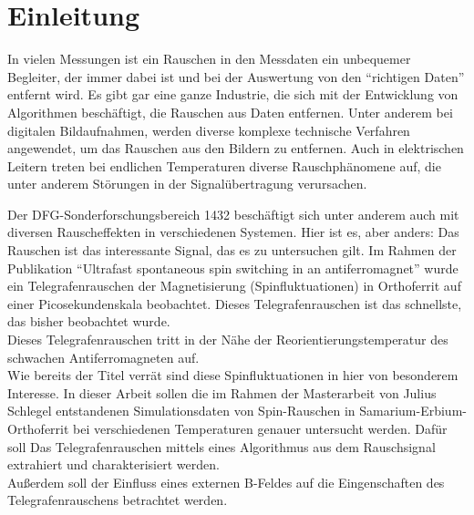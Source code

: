 \documentclass[main.tex]{subfiles}
\begin{document}
\section{Einleitung}


In vielen Messungen ist ein Rauschen in den Messdaten ein unbequemer Begleiter, der immer dabei ist und bei der Auswertung von den \enquote{richtigen Daten} entfernt wird. 
Es gibt gar eine ganze Industrie, die sich mit der Entwicklung von Algorithmen beschäftigt, die Rauschen aus Daten entfernen. Unter anderem bei digitalen Bildaufnahmen, werden diverse komplexe technische Verfahren angewendet, um das Rauschen aus den Bildern zu entfernen. Auch in elektrischen Leitern treten bei endlichen Temperaturen diverse Rauschphänomene auf, die unter anderem Störungen in der Signalübertragung verursachen.\\ 

Der DFG-Sonderforschungsbereich 1432 \cite{sfb-1432} beschäftigt sich unter anderem auch mit diversen Rauscheffekten in verschiedenen Systemen.
Hier ist es, aber anders: Das Rauschen ist das interessante Signal, das es zu untersuchen gilt. Im Rahmen der Publikation \enquote{Ultrafast spontaneous spin switching in an antiferromagnet} \cite{weiss-ultrafast} wurde ein Telegrafenrauschen der Magnetisierung (Spinfluktuationen) in Orthoferrit auf einer Picosekundenskala beobachtet. Dieses Telegrafenrauschen ist das schnellste, das bisher beobachtet wurde.\\
Dieses Telegrafenrauschen tritt in der Nähe der Reorientierungstemperatur des schwachen Antiferromagneten auf.\\

Wie bereits der Titel verrät sind diese Spinfluktuationen in  hier von besonderem Interesse.
In dieser Arbeit sollen die im Rahmen der Masterarbeit von Julius Schlegel \cite{schlegel-master} entstandenen Simulationsdaten von Spin-Rauschen in Samarium-Erbium-Orthoferrit bei verschiedenen Temperaturen genauer untersucht werden. Dafür soll Das Telegrafenrauschen mittels eines Algorithmus aus dem Rauschsignal extrahiert und charakterisiert werden.\\
Außerdem soll der Einfluss eines externen B-Feldes auf die Eingenschaften des Telegrafenrauschens betrachtet werden.


\end{document}
